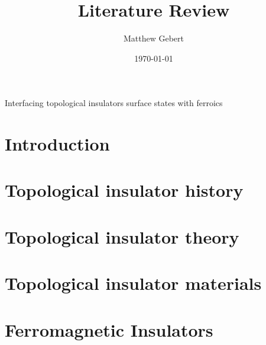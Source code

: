 \documentclass{article} %
\title{Literature Review}
\date{\today}
\author{Matthew Gebert}
\begin{document}
	\maketitle
	\begingroup
	\centering
		\vspace{5mm}\LARGE Interfacing topological insulators surface states with ferroics\\\vspace{1.5cm}	
	\endgroup
	\normalfont\normalsize
		
		
\renewcommand{\baselinestretch}{0.94}\normalsize
\tableofcontents
\renewcommand{\baselinestretch}{1}\normalsize
		
\section{Introduction}


\section{Topological insulator history}


\section{Topological insulator theory}


\section{Topological insulator materials}


%
\section{Ferromagnetic Insulators}

\end{document}
